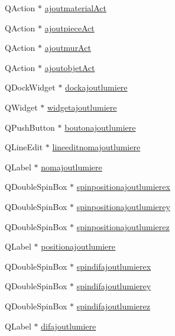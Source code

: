 \begin{DoxyCompactItemize}
\item 
Q\+Action $\ast$ \hyperlink{class_main_window_ae531eca2b9941c7f260f466edd97790e}{ajoutmaterial\+Act}
\item 
Q\+Action $\ast$ \hyperlink{class_main_window_a150ff31dd92454823cf92bd6d4d1852d}{ajoutpiece\+Act}
\item 
Q\+Action $\ast$ \hyperlink{class_main_window_ad2fca762b760f8d9dd224c820a188623}{ajoutmur\+Act}
\item 
Q\+Action $\ast$ \hyperlink{class_main_window_a4a661ddac989853564e72a960e4f5e79}{ajoutobjet\+Act}
\item 
Q\+Dock\+Widget $\ast$ \hyperlink{class_main_window_a391dd00592f215079a80db989f24266e}{dockajoutlumiere}
\item 
Q\+Widget $\ast$ \hyperlink{class_main_window_a9e2c8a96b09dbbfaa041531420603b9e}{widgetajoutlumiere}
\item 
Q\+Push\+Button $\ast$ \hyperlink{class_main_window_a4f7a42439a3d1dbc5213e5d2282f5ab0}{boutonajoutlumiere}
\item 
Q\+Line\+Edit $\ast$ \hyperlink{class_main_window_a88ef14a32e7bd0694d8c970b700588c8}{lineeditnomajoutlumiere}
\item 
Q\+Label $\ast$ \hyperlink{class_main_window_ad38c142eee23820d2d4c87217ea3558a}{nomajoutlumiere}
\item 
Q\+Double\+Spin\+Box $\ast$ \hyperlink{class_main_window_a5286af2240735027e43e96856889ba2d}{spinpositionajoutlumierex}
\item 
Q\+Double\+Spin\+Box $\ast$ \hyperlink{class_main_window_af8f989d61672591976f45a3857bd4088}{spinpositionajoutlumierey}
\item 
Q\+Double\+Spin\+Box $\ast$ \hyperlink{class_main_window_a190e482131a28865d5cb0956a1149272}{spinpositionajoutlumierez}
\item 
Q\+Label $\ast$ \hyperlink{class_main_window_a3c50fe103c1d0f1278737bced7e2e452}{positionajoutlumiere}
\item 
Q\+Double\+Spin\+Box $\ast$ \hyperlink{class_main_window_a0c740f449736ce6c303b0675f954f050}{spindifajoutlumierex}
\item 
Q\+Double\+Spin\+Box $\ast$ \hyperlink{class_main_window_ae03c85b751d4a28e2916e66d82d7e72d}{spindifajoutlumierey}
\item 
Q\+Double\+Spin\+Box $\ast$ \hyperlink{class_main_window_afca1245690133c96c9e182b0b56c6006}{spindifajoutlumierez}
\item 
Q\+Label $\ast$ \hyperlink{class_main_window_a87d3bd68a5f4e2323110804c4111dcc9}{difajoutlumiere}

\end{DoxyCompactItemize}

